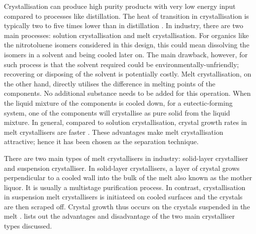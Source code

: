 Crystallisation can produce high purity products with very low energy input compared to processes like distillation. The heat of transition in crystallisation is typically two to five times lower than in distillation \cite{bassett_melt_2021}. In industry, there are two main processes: solution crystallisation and melt crystallisation. For organics like the nitrotoluene isomers considered in this design, this could mean dissolving the isomers in a solvent and being cooled later on. The main drawback, however, for such process is that the solvent required could be environmentally-unfriendly; recovering or disposing of the solvent is potentially costly. Melt crystallisation, on the other hand, directly utilises the difference in melting points of the components. No additional substance needs to be added for this operation. When the liquid mixture of the components is cooled down, for a eutectic-forming system, one of the components will crystallise as pure solid from the liquid mixture. In general, compared to solution crystallisation, crystal growth rates in melt crystallisers are faster \cite{myerson_handbook_2019}. These advantages make melt crystallisation attractive; hence it has been chosen as the separation technique. 


There are two main types of melt crystallisers in industry: solid-layer crystalliser and suspension crystalliser. In solid-layer crystallisers, a layer of crystal grows perpendicular to a cooled wall into the bulk of the melt also known as the mother liquor. It is usually a multistage purification process. In contrast, crystallisation in suspension melt crystallisers is initiateed on cooled surfaces and the crystals are then scraped off. Crystal growth thus occurs on the crystals suspended in the melt \cite{myerson_handbook_2019}.  lists out the advantages and disadvantage of the two main crystalliser types discussed. 

